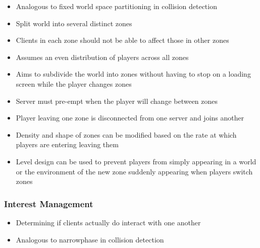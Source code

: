 \documentclass[a4paper]{article}
\begin{document}

\begin{itemize}
  \item
    Analogous to fixed world space partitioning in collision detection

  \item
    Split world into several distinct zones

  \item
    Clients in each zone should not be able to affect those in other zones

  \item
    Assumes an even distribution of players across all zones

\end{itemize}


\begin{itemize}
  \item
    Aims to subdivide the world into zones without having to stop on a loading
    screen while the player changes zones

  \item
    Server must pre-empt when the player will change between zones

  \item
    Player leaving one zone is disconnected from one server and joins another

  \item
    Density and shape of zones can be modified based on the rate at which
    players are entering leaving them

  \item
    Level design can be used to prevent players from simply appearing in a world
    or the environment of the new zone suddenly appearing when players switch
    zones

\end{itemize}

\subsubsection{Interest Management}

\begin{itemize}
  \item
    Determining if clients actually do interact with one another

  \item
    Analogous to narrowphase in collision detection

\end{itemize}
\end{document}
